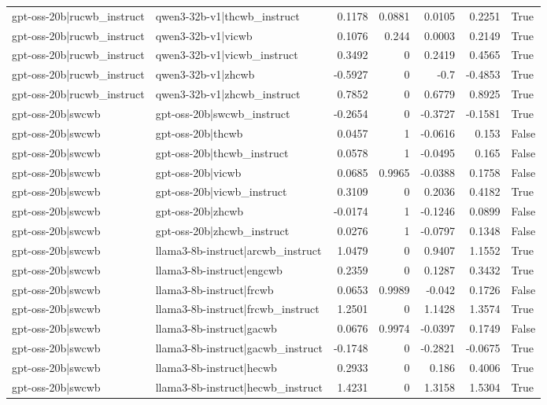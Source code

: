 \begin{table}
\begin{tabular}{l l r r r r l}
gpt-oss-20b|rucwb_instruct & qwen3-32b-v1|thcwb_instruct & 0.1178 & 0.0881 & 0.0105 & 0.2251 & True \\
gpt-oss-20b|rucwb_instruct & qwen3-32b-v1|vicwb & 0.1076 & 0.244 & 0.0003 & 0.2149 & True \\
gpt-oss-20b|rucwb_instruct & qwen3-32b-v1|vicwb_instruct & 0.3492 & 0 & 0.2419 & 0.4565 & True \\
gpt-oss-20b|rucwb_instruct & qwen3-32b-v1|zhcwb & -0.5927 & 0 & -0.7 & -0.4853 & True \\
gpt-oss-20b|rucwb_instruct & qwen3-32b-v1|zhcwb_instruct & 0.7852 & 0 & 0.6779 & 0.8925 & True \\
gpt-oss-20b|swcwb & gpt-oss-20b|swcwb_instruct & -0.2654 & 0 & -0.3727 & -0.1581 & True \\
gpt-oss-20b|swcwb & gpt-oss-20b|thcwb & 0.0457 & 1 & -0.0616 & 0.153 & False \\
gpt-oss-20b|swcwb & gpt-oss-20b|thcwb_instruct & 0.0578 & 1 & -0.0495 & 0.165 & False \\
gpt-oss-20b|swcwb & gpt-oss-20b|vicwb & 0.0685 & 0.9965 & -0.0388 & 0.1758 & False \\
gpt-oss-20b|swcwb & gpt-oss-20b|vicwb_instruct & 0.3109 & 0 & 0.2036 & 0.4182 & True \\
gpt-oss-20b|swcwb & gpt-oss-20b|zhcwb & -0.0174 & 1 & -0.1246 & 0.0899 & False \\
gpt-oss-20b|swcwb & gpt-oss-20b|zhcwb_instruct & 0.0276 & 1 & -0.0797 & 0.1348 & False \\
gpt-oss-20b|swcwb & llama3-8b-instruct|arcwb_instruct & 1.0479 & 0 & 0.9407 & 1.1552 & True \\
gpt-oss-20b|swcwb & llama3-8b-instruct|engcwb & 0.2359 & 0 & 0.1287 & 0.3432 & True \\
gpt-oss-20b|swcwb & llama3-8b-instruct|frcwb & 0.0653 & 0.9989 & -0.042 & 0.1726 & False \\
gpt-oss-20b|swcwb & llama3-8b-instruct|frcwb_instruct & 1.2501 & 0 & 1.1428 & 1.3574 & True \\
gpt-oss-20b|swcwb & llama3-8b-instruct|gacwb & 0.0676 & 0.9974 & -0.0397 & 0.1749 & False \\
gpt-oss-20b|swcwb & llama3-8b-instruct|gacwb_instruct & -0.1748 & 0 & -0.2821 & -0.0675 & True \\
gpt-oss-20b|swcwb & llama3-8b-instruct|hecwb & 0.2933 & 0 & 0.186 & 0.4006 & True \\
gpt-oss-20b|swcwb & llama3-8b-instruct|hecwb_instruct & 1.4231 & 0 & 1.3158 & 1.5304 & True \\

\end{tabular}
\end{table}
